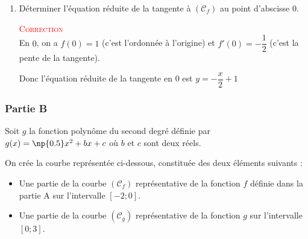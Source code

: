 \begin{enumerate}
	\textcolor{red}{\textsc{Correction}}\\
	$f$ atteint en $-1$ son maximum qui est $\dfrac{\e}{2}\approx\np{1.35}$.

	Donc \mbox{$\forall x\in\R, f(x)\leqslant2$}, l'affirmation est vraie.
	\item Déterminer l'équation réduite de la tangente à \mbox{$(\mathcal{C}_f)$} au point d'abscisse 0.

	\textcolor{red}{\textsc{Correction}}\\
	En $0$, on a $f(0)=1$ (c'est l'ordonnée à l'origine) et $f'(0)=-\dfrac12$ (c'est la pente de la tangente).

	Donc l'équation réduite de la tangente en $0$ est \mbox{$y=-\dfrac x 2 +1$}
\end{enumerate}

\subsubsection*{Partie B}

Soit $g$ la fonction polynôme du second degré définie par \mbox{$g(x)=\np{0.5}x^2+bx+c$} où $b$ et $c$ sont deux réels.

On crée la courbe représentée ci-dessous, constituée des deux éléments suivants :
\begin{itemize}[label=$\bullet$]
	\item Une partie de la courbe \mbox{$(\mathcal{C}_f)$} représentative de la fonction $f$ définie dans la partie A sur l'intervalle \mbox{$[-2;0]$}.



	\item Une partie de la courbe \mbox{$(\mathcal{C}_g)$} représentative de la fonction $g$  sur l'intervalle \mbox{$[0;3]$}.
\end{itemize}

